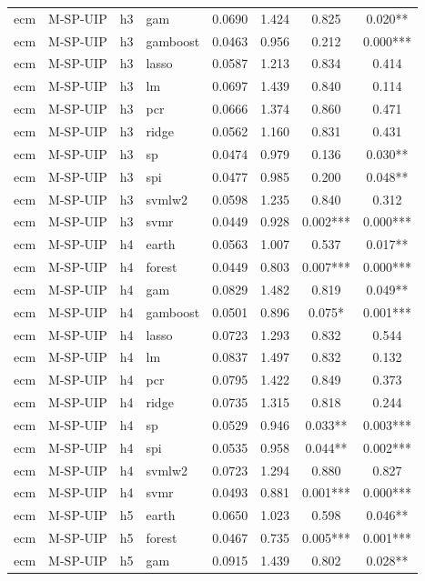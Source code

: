 \begin{ThreePartTable}
\begin{longtable}[t]{llclcccc}
ecm & M-SP-UIP & h3 & gam & 0.0690 & 1.424 & 0.825 & 0.020**\\
ecm & M-SP-UIP & h3 & gamboost & 0.0463 & 0.956 & 0.212 & 0.000***\\
ecm & M-SP-UIP & h3 & lasso & 0.0587 & 1.213 & 0.834 & 0.414\\
ecm & M-SP-UIP & h3 & lm & 0.0697 & 1.439 & 0.840 & 0.114\\
ecm & M-SP-UIP & h3 & pcr & 0.0666 & 1.374 & 0.860 & 0.471\\
ecm & M-SP-UIP & h3 & ridge & 0.0562 & 1.160 & 0.831 & 0.431\\
ecm & M-SP-UIP & h3 & sp & 0.0474 & 0.979 & 0.136 & 0.030**\\
ecm & M-SP-UIP & h3 & spi & 0.0477 & 0.985 & 0.200 & 0.048**\\
ecm & M-SP-UIP & h3 & svmlw2 & 0.0598 & 1.235 & 0.840 & 0.312\\
ecm & M-SP-UIP & h3 & svmr & 0.0449 & 0.928 & 0.002*** & 0.000***\\
\addlinespace
ecm & M-SP-UIP & h4 & earth & 0.0563 & 1.007 & 0.537 & 0.017**\\
ecm & M-SP-UIP & h4 & forest & 0.0449 & 0.803 & 0.007*** & 0.000***\\
ecm & M-SP-UIP & h4 & gam & 0.0829 & 1.482 & 0.819 & 0.049**\\
ecm & M-SP-UIP & h4 & gamboost & 0.0501 & 0.896 & 0.075* & 0.001***\\
ecm & M-SP-UIP & h4 & lasso & 0.0723 & 1.293 & 0.832 & 0.544\\
ecm & M-SP-UIP & h4 & lm & 0.0837 & 1.497 & 0.832 & 0.132\\
ecm & M-SP-UIP & h4 & pcr & 0.0795 & 1.422 & 0.849 & 0.373\\
ecm & M-SP-UIP & h4 & ridge & 0.0735 & 1.315 & 0.818 & 0.244\\
ecm & M-SP-UIP & h4 & sp & 0.0529 & 0.946 & 0.033** & 0.003***\\
ecm & M-SP-UIP & h4 & spi & 0.0535 & 0.958 & 0.044** & 0.002***\\
ecm & M-SP-UIP & h4 & svmlw2 & 0.0723 & 1.294 & 0.880 & 0.827\\
ecm & M-SP-UIP & h4 & svmr & 0.0493 & 0.881 & 0.001*** & 0.000***\\
\addlinespace
ecm & M-SP-UIP & h5 & earth & 0.0650 & 1.023 & 0.598 & 0.046**\\
ecm & M-SP-UIP & h5 & forest & 0.0467 & 0.735 & 0.005*** & 0.001***\\
ecm & M-SP-UIP & h5 & gam & 0.0915 & 1.439 & 0.802 & 0.028**\\

\end{longtable}
\end{ThreePartTable}
